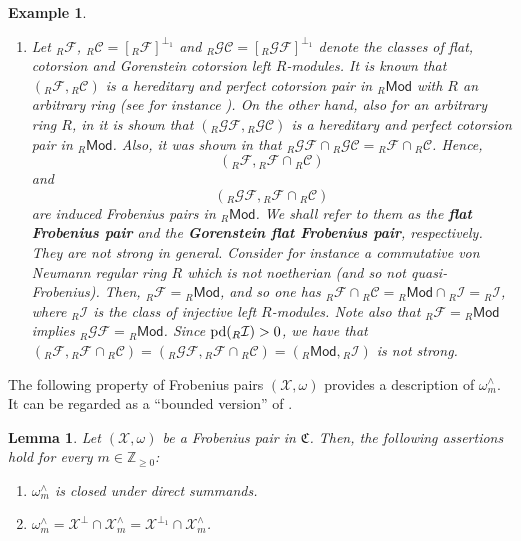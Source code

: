 \documentclass[10pt,reqno]{amsart}
\numberwithin{equation}{section}
\newtheorem{example}[definition]{Example}
\newtheorem{lemma}[definition]{Lemma}
\theoremstyle{remark}
\newcommand{\X}{\mathcal{X}}
\begin{document}
\begin{example}
\begin{enumerate}[(1)]
\begin{enumerate}[(i)]
\item Estrada and Iacob also showed in \cite[Thm. 3]{Estrada24} that ${}_R\mathcal{GP}$ is special precovering provided that there exists $n \in \mathbb{Z}_{\geq 0}$ such that every finitely presented left $R$-module has Gorenstein projective dimension $\leq n$. 
\end{enumerate}

\item Let ${}_R\mathcal{F}$, ${}_R\mathcal{C} = [{}_R\mathcal{F}]^{\perp_1}$ and ${}_R\mathcal{GC} = [{}_R\mathcal{GF}]^{\perp_1}$ denote the classes of flat, cotorsion and Gorenstein cotorsion left $R$-modules. It is known that $({}_R\mathcal{F}, {}_R\mathcal{C})$ is a hereditary and perfect cotorsion pair in ${}_R\mathsf{Mod}$ with $R$ an arbitrary ring (see for instance \cite[Prop. 7.4.3 \& Thm. 7.4.4]{EnJen00}). On the other hand, also for an arbitrary ring $R$, in \cite[Coroll. 4.12]{Saroch} it is shown that $({}_R\mathcal{GF},{}_R\mathcal{GC})$ is a hereditary and perfect cotorsion pair in ${}_R\mathsf{Mod}$. Also, it was shown in \cite[Prop. 3.1 (1)]{EstradaMarco} that ${}_R\mathcal{GF} \cap {}_R\mathcal{GC} = {}_R\mathcal{F} \cap {}_R\mathcal{C}$. Hence, $$({}_R\mathcal{F},{}_R\mathcal{F} \cap {}_R\mathcal{C})$$ and $$({}_R\mathcal{GF},{}_R\mathcal{F} \cap {}_R\mathcal{C})$$ are induced Frobenius pairs in ${}_R\mathsf{Mod}$. We shall refer to them as the \textbf{flat Frobenius pair} and the \textbf{Gorenstein flat Frobenius pair}, respectively. They are not strong in general. Consider for instance a commutative von Neumann regular ring $R$ which is not noetherian (and so not quasi-Frobenius). Then, ${}_R\mathcal{F} = {}_R\mathsf{Mod}$, and so one has ${}_R\mathcal{F} \cap {}_R\mathcal{C} = {}_R\mathsf{Mod} \cap {}_R\mathcal{I} = {}_R\mathcal{I}$, where ${}_R\mathcal{I}$ is the class of injective left $R$-modules. Note also that ${}_R\mathcal{F} = {}_R\mathsf{Mod}$ implies ${}_R\mathcal{GF} = {}_R\mathsf{Mod}$. Since ${\rm pd}({}_R\mathcal{I}) > 0$, we have that $({}_R\mathcal{F},{}_R\mathcal{F} \cap {}_R\mathcal{C}) = ({}_R\mathcal{GF},{}_R\mathcal{F} \cap {}_R\mathcal{C}) = ({}_R\mathsf{Mod},{}_R\mathcal{I})$ is not strong.
\end{enumerate}
\end{example}


The following property of Frobenius pairs $(\X,\omega)$ provides a description of $\omega^\wedge_m$. It can be regarded as a ``bounded version'' of \cite[Prop. 2.13]{BMSP}. 


\begin{lemma} \label{LemaGorro}
Let $(\X, \omega)$ be a Frobenius pair in $\mathfrak{C}$. Then, the following assertions hold for every $m \in \mathbb{Z}_{\geq 0}$:
\begin{enumerate}[(1)]
\item $\omega^{\wedge}_m$ is closed under direct summands.

\item $\omega^{\wedge}_m =  \X^{\perp} \cap \X^{\wedge}_m = \X^{\perp_1} \cap \X^{\wedge}_m$. \\
\end{enumerate}
\end{lemma} 
\end{document}
